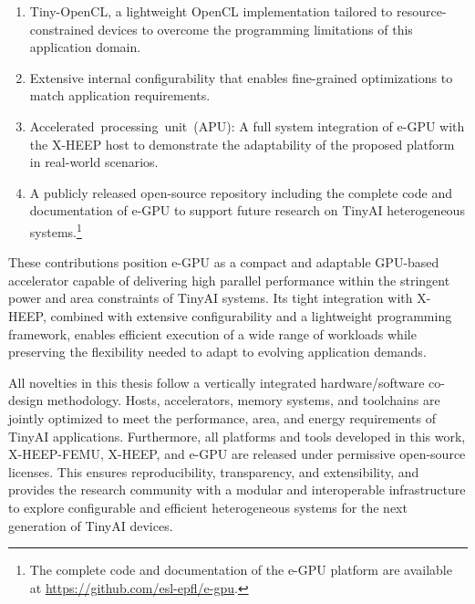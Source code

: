 \begin{itemize}
\begin{enumerate}[label=(\alph*)]
                \item \mbox{Tiny-OpenCL}, a lightweight OpenCL implementation tailored to resource-constrained devices to overcome the programming limitations of this application domain.
        
                \item Extensive internal configurability that enables fine-grained optimizations to match application requirements.

                \item \mbox{Accelerated processing unit (APU)}: A full system integration of e-GPU with the \mbox{X-HEEP} host to demonstrate the adaptability of the proposed platform in real-world scenarios.
        
                \item A publicly released open-source repository including the complete code and documentation of \mbox{e-GPU} to support future research on TinyAI heterogeneous systems.\footnote{The complete code and documentation of the e-GPU platform are available at \url{https://github.com/esl-epfl/e-gpu}.}
            \end{enumerate}

            These contributions position \mbox{e-GPU} as a compact and adaptable GPU-based accelerator capable of delivering high parallel performance within the stringent power and area constraints of TinyAI systems. Its tight integration with \mbox{X-HEEP}, combined with extensive configurability and a lightweight programming framework, enables efficient execution of a wide range of workloads while preserving the flexibility needed to adapt to evolving application demands.
        
        \end{itemize}
        
        All novelties in this thesis follow a vertically integrated hardware/software co-design methodology. Hosts, accelerators, memory systems, and toolchains are jointly optimized to meet the performance, area, and energy requirements of TinyAI applications. Furthermore, all platforms and tools developed in this work, \mbox{X-HEEP-FEMU}, \mbox{X-HEEP}, and \mbox{e-GPU} are released under permissive open-source licenses. This ensures reproducibility, transparency, and extensibility, and provides the research community with a modular and interoperable infrastructure to explore configurable and efficient heterogeneous systems for the next generation of TinyAI devices.

